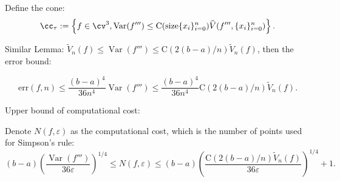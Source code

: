 \documentclass[]{elsarticle}
\DeclareMathOperator{\Var}{Var}
\theoremstyle{definition}
\theoremstyle{remark}
\begin{document}
Define the cone:
\begin{equation}\label{coneinteg}
\cc_{\tau}:=\left\{f\in \cv^{3}, \Var(f''')\leq \textrm{C}(\text{size}\{x_i\}_{i=0}^{n})\widehat{V}(f''',\{x_i\}_{i=0}^{n})\right\}.
\end{equation}
%

Similar Lemma: $\widetilde{V}_n(f)\leq \Var(f''') \leq \textrm{C}(2(b-a)/n)\widetilde{V}_n(f)$, then the error bound:

$$\text{err}(f,n)\leq\frac{(b-a)^4}{36n^4}\Var(f''')\leq\frac{(b-a)^4}{36n^4}\textrm{C}(2(b-a)/n)\widetilde{V}_n(f).$$


Upper bound of computational cost:

Denote $N(f,\varepsilon)$ as the computational cost, which is the number of points used for Simpson's rule:
$$(b-a)\left(\frac{\Var(f''')}{36\varepsilon}\right)^{1/4}\leq N(f,\varepsilon) \leq (b-a)\left(\frac{\textrm{C}(2(b-a)/n)\widetilde{V}_n(f)}{36\varepsilon}\right)^{1/4}+1.$$
\end{document}
